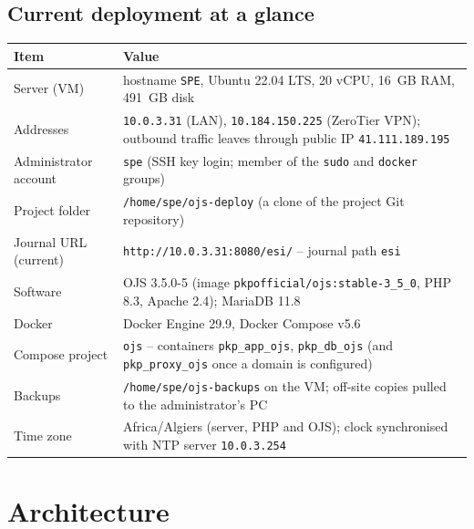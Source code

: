 \documentclass[11pt,a4paper]{report}
\newcommand{\code}[1]{\texttt{\small #1}}
\newcommand{\file}[1]{\texttt{\small #1}}
\begin{document}
\section{Current deployment at a glance}
\begin{tabularx}{\linewidth}{@{}P{4.6cm}L@{}}
\toprule
\textbf{Item} & \textbf{Value} \\
\midrule
Server (VM)            & hostname \code{SPE}, Ubuntu 22.04 LTS, 20 vCPU, 16~GB RAM, 491~GB disk \\
Addresses              & \code{10.0.3.31} (LAN), \code{10.184.150.225} (ZeroTier VPN); outbound traffic leaves through public IP \code{41.111.189.195} \\
Administrator account  & \code{spe} (SSH key login; member of the \code{sudo} and \code{docker} groups) \\
Project folder         & \file{/home/spe/ojs-deploy} (a clone of the project Git repository) \\
Journal URL (current)  & \code{http://10.0.3.31:8080/esi/} -- journal path \code{esi} \\
Software               & OJS 3.5.0-5 (image \code{pkpofficial/ojs:\allowbreak stable-3\_5\_0}, PHP 8.3, Apache 2.4); MariaDB 11.8 \\
Docker                 & Docker Engine 29.9, Docker Compose v5.6 \\
Compose project        & \code{ojs} -- containers \code{pkp\_app\_ojs}, \code{pkp\_db\_ojs} (and \code{pkp\_proxy\_ojs} once a domain is configured) \\
Backups                & \file{/home/spe/ojs-backups} on the VM; off-site copies pulled to the administrator's PC \\
Time zone              & Africa/Algiers (server, PHP and OJS); clock synchronised with NTP server \code{10.0.3.254} \\
\bottomrule
\end{tabularx}

\chapter{Architecture}\label{ch:arch}
\end{document}

